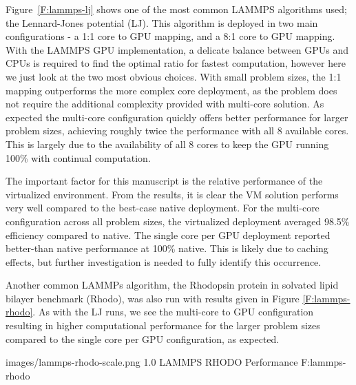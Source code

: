 \documentclass{sigplanconf}
\begin{document}
Figure~\ref{F:lammps-lj} shows one of the most common LAMMPS algorithms used; the Lennard-Jones potential (LJ).  This algorithm is deployed in two main configurations - a 1:1 core to GPU mapping, and a 8:1 core to GPU mapping.  With the LAMMPS GPU implementation, a delicate balance between GPUs and CPUs is required to find the optimal ratio for fastest computation, however here we just look at the two most obvious choices. With small problem sizes, the 1:1 mapping outperforms the more complex core deployment, as the problem does not require the additional complexity provided with multi-core solution.  As expected the multi-core configuration quickly offers better performance for larger problem sizes, achieving roughly twice the performance with all 8 available cores. This is largely due to the availability of all 8 cores to keep the GPU running 100\% with continual computation.
 
The important factor for this manuscript is the relative performance of the virtualized environment. From the results, it is clear the VM solution performs very well compared to the best-case native deployment. For the multi-core configuration across all problem sizes, the virtualized deployment averaged 98.5\% efficiency compared to native. The single core per GPU deployment reported better-than native performance at 100\% native.  This is likely due to caching effects, but further investigation is needed to fully identify this occurrence. 



Another common LAMMPs algorithm, the Rhodopsin protein in solvated lipid bilayer benchmark (Rhodo), was also run with results given in Figure \ref{F:lammps-rhodo}. As with the LJ runs, we see the multi-core to GPU configuration resulting in higher computational performance for the larger problem sizes compared to the single core per GPU configuration, as expected.  

  {images/lammps-rhodo-scale.png}
  {1.0}
  {LAMMPS RHODO Performance}
  {F:lammps-rhodo}
\end{document}
